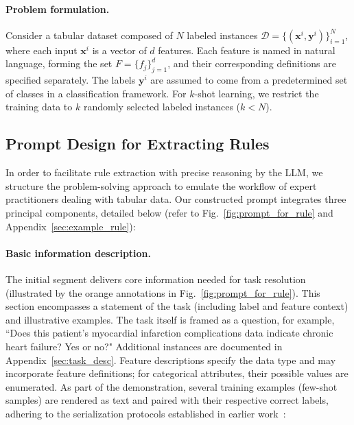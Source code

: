\vspace*{-0.12in}
\paragraph{Problem formulation.} Consider a tabular dataset composed of $N$ labeled instances $\mathcal{D} = \{(\mathbf{x}^i, \mathbf{y}^i)\}_{i=1}^{N}$, where each input $\mathbf{x}^i$ is a vector of $d$ features. Each feature is named in natural language, forming the set $F = \{f_j\}_{j=1}^{d}$, and their corresponding definitions are specified separately. The labels $\mathbf{y}^i$ are assumed to come from a predetermined set of classes in a classification framework. For $k$-shot learning, we restrict the training data to $k$ randomly selected labeled instances ($k < N$).

\subsection{Prompt Design for Extracting Rules}
\label{Sec:prompt_design}
In order to facilitate rule extraction with precise reasoning by the LLM, we structure the problem-solving approach to emulate the workflow of expert practitioners dealing with tabular data. Our constructed prompt integrates three principal components, detailed below (refer to Fig.~\ref{fig:prompt_for_rule} and Appendix~\ref{sec:example_rule}):

\vspace*{-0.12in}
\paragraph{Basic information description.} The initial segment delivers core information needed for task resolution (illustrated by the orange annotations in Fig.~\ref{fig:prompt_for_rule}). This section encompasses a statement of the task (including label and feature context) and illustrative examples. The task itself is framed as a question, for example, ``Does this patient's myocardial infarction complications data indicate chronic heart failure? Yes or no?" Additional instances are documented in Appendix~\ref{sec:task_desc}. Feature descriptions specify the data type and may incorporate feature definitions; for categorical attributes, their possible values are enumerated. As part of the demonstration, several training examples (few-shot samples) are rendered as text and paired with their respective correct labels, adhering to the serialization protocols established in earlier work~\cite{dinh2022lift,hegselmann2023tabllm}:

